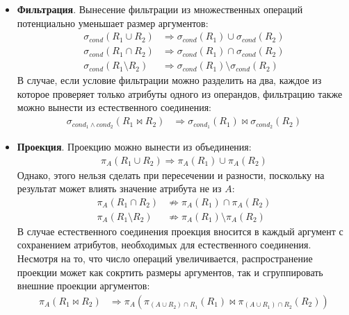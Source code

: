 \begin{itemize}
	\item \textbf{Фильтрация}. Вынесение фильтрации из множественных операций потенциально
	      уменьшает размер аргументов:
	      \begin{align}
		      \sigma_{cond}(R_1 \cup R_2)      & \Rightarrow \sigma_{cond}(R_1) \cup \sigma_{cond}(R_2) \\
		      \sigma_{cond}(R_1 \cap R_2)      & \Rightarrow \sigma_{cond}(R_1) \cap \sigma_{cond}(R_2) \\
		      \sigma_{cond}(R_1 \setminus R_2) & \Rightarrow \sigma_{cond}(R_1) \setminus
		      \sigma_{cond}(R_2)
	      \end{align}
	      В случае, если условие фильтрации можно разделить на два, каждое из которое проверяет только
	      атрибуты одного из операндов, фильтрацию также можно вынести из естественного соединения:
	      \begin{align}
		      \sigma_{cond_1 \wedge cond_2}(R_1 \bowtie R_2) & \Rightarrow \sigma_{cond_1}(R_1)
		      \bowtie \sigma_{cond_2}(R_2)
	      \end{align}
	\item \textbf{Проекция}. Проекцию можно вынести из объединения:
	      \begin{align}
		      \pi_A(R_1 \cup R_2) \Rightarrow \pi_A(R_1) \cup \pi_A(R_2)
	      \end{align}
	      Однако, этого нельзя сделать при пересечении и разности, поскольку на результат может влиять
	      значение атрибута не из $A$:
	      \begin{align}
		      \pi_A(R_1 \cap R_2)      & \not\Rightarrow \pi_A(R_1) \cap \pi_A(R_2)      \\
		      \pi_A(R_1 \setminus R_2) & \not\Rightarrow \pi_A(R_1) \setminus \pi_A(R_2)
	      \end{align}
	      В случае естественного соединения проекция вносится в каждый аргумент с сохранением атрибутов,
	      необходимых для естественного соединения. Несмотря на то, что число операций увеличивается,
	      распространение проекции может как сокртить размеры аргументов, так и сгруппировать внешние
	      проекции аргументов:
	      \begin{align}
		      \pi_A(R_1 \bowtie R_2) & \Rightarrow \pi_A(\pi_{(A \cup R_2) \cap R_1}(R_1) \bowtie
		      \pi_{(A \cup R_1) \cap R_2}(R_2))
	      \end{align}
\end{itemize}

